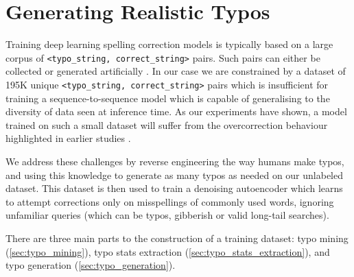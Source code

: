 \documentclass[11pt,a4paper]{article}
\begin{document}
\section{Generating Realistic Typos}
Training deep learning spelling correction models is typically based on a large corpus of \texttt{<typo\_string, correct\_string>} pairs. Such pairs can either be collected \cite{hasan2015spelling,movin2018spelling} or generated artificially \cite{felice2014generating,rei2017artificial}. In our case we are constrained by a dataset of 195K unique \texttt{<typo\_string, correct\_string>} pairs which is insufficient for training a sequence-to-sequence model which is capable of generalising to the diversity of data seen at inference time. As our experiments have shown, a model trained on such a small dataset will suffer from the overcorrection behaviour highlighted in earlier studies \cite{sun2010learning,Zhu2019}.

We address these challenges by reverse engineering the way humans make typos, and using this knowledge to generate as many typos as needed on our unlabeled dataset. This dataset is then used to train a denoising autoencoder which learns to attempt corrections only on misspellings of commonly used words, ignoring unfamiliar queries (which can be typos, gibberish or valid long-tail searches).

There are three main parts to the construction of a training dataset: typo mining (\cref{sec:typo_mining}), typo stats extraction (\cref{sec:typo_stats_extraction}), and typo generation (\cref{sec:typo_generation}).
\end{document}
